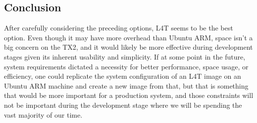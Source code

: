 \subsection{Conclusion}
After carefully considering the preceding options, L4T seems to be the best option. Even though it may have more overhead than Ubuntu ARM, space isn't a big concern on the TX2, and it would likely be more effective during development stages given its inherent usability and simplicity. If at some point in the future, system requirements dictated a necessity for better performance, space usage, or efficiency, one could replicate the system configuration of an L4T image on an Ubuntu ARM machine and create a new image from that, but that is something that would be more important for a production system, and those constraints will not be important during the development stage where we will be spending the vast majority of our time.
